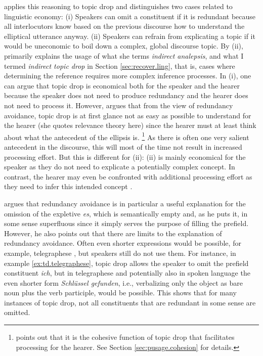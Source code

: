 \citet[167]{helmer2016} applies this reasoning to topic drop and distinguishes two cases related to linguistic economy:
(i) Speakers can omit a constituent if it is redundant because all interlocutors know based on the previous discourse how to understand the elliptical utterance anyway.
(ii) Speakers can refrain from explicating a topic  if it would be uneconomic to boil down a complex, global discourse topic. 
By (ii), \citet{helmer2016} primarily explains the usage of what she terms \textit{indirect analepsis}, and what I termed \textit{indirect topic drop} in Section \ref{sec:recover.ling}, that is, cases where determining the reference requires more complex inference processes.
In (i), one can argue that topic drop is economical both for the speaker and the hearer because the speaker does not need to produce redundancy and the hearer does not need to process it.
However, \citet[45]{helmer2016} argues that from the view of redundancy avoidance, topic drop is at first glance not as easy as possible to understand for the hearer (she quotes  relevance theory  here) since the hearer must at least think about what the antecedent  of the ellipsis is.%
\footnote{\citet[45]{helmer2016} points out that it is the cohesive function of topic drop that facilitates processing for the hearer. 
See Section \ref{sec:pusage.cohesion} for details.}
%
As there is often one very salient  antecedent  in the discourse, this will most of the time not result in increased processing effort. 
But this is different for (ii):
(ii) is mainly economical for the speaker as they do not need to explicate a potentially complex concept.
In contrast, the hearer may even be confronted with additional processing effort as they need to infer this intended concept \citep[169--170]{helmer2016}. 

\citet{poitou1993} argues that redundancy avoidance is in particular a useful explanation for the omission of the expletive  \textit{es}, which is semantically empty and, as he puts it, in some sense superfluous since it simply serves the purpose of filling the prefield. 
However, he also points out that there are limits to the explanation of redundancy avoidance.
Often even shorter expressions would be possible, for example, telegraphese \citep[123]{poitou1993}, but speakers still do not use them.
For instance, in example \ref{ex:td.telegraphese}, topic drop allows the speaker to omit the prefield constituent \textit{ich}, but in telegraphese and potentially also in spoken language the even shorter form \textit{Schlüssel gefunden}, i.e., verbalizing only the object as bare noun plus the verb participle, would be possible.
This shows that for many instances of topic drop, not all constituents that are redundant in some sense are omitted.

